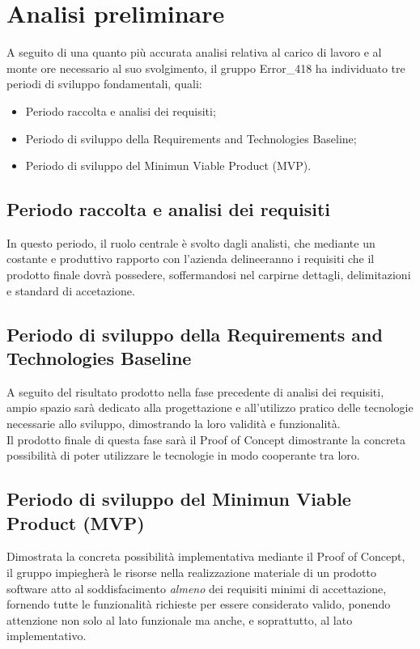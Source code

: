 \documentclass[a4paper, twoside]{article}
\begin{document}
\newpage %



\section{Analisi preliminare}
\large{A seguito di una quanto più accurata analisi relativa al carico di lavoro e al monte ore necessario al suo svolgimento, il gruppo Error\_418 ha individuato tre periodi di sviluppo fondamentali, quali:}
\begin{itemize}
    \item Periodo raccolta e analisi dei requisiti;
    \item Periodo di sviluppo della Requirements and Technologies Baseline;
    \item Periodo di sviluppo del Minimun Viable Product (MVP).
\end{itemize}

\subsection{Periodo raccolta e analisi dei requisiti}
In questo periodo, il ruolo centrale è svolto dagli analisti, che mediante un costante e produttivo rapporto con l'azienda delineeranno i requisiti che il prodotto finale dovrà possedere, soffermandosi nel carpirne dettagli, delimitazioni e standard di accetazione.

\subsection{Periodo di sviluppo della Requirements and Technologies Baseline}
A seguito del risultato prodotto nella fase precedente di analisi dei requisiti, ampio spazio sarà dedicato alla progettazione e all'utilizzo pratico delle tecnologie necessarie allo sviluppo, dimostrando la loro validità e funzionalità. \\
Il prodotto finale di questa fase sarà il Proof of Concept dimostrante la concreta possibilità di poter utilizzare le tecnologie in modo cooperante tra loro.

\subsection{Periodo di sviluppo del Minimun Viable Product (MVP)}
Dimostrata la concreta possibilità implementativa mediante il Proof of Concept, il gruppo impiegherà le risorse nella realizzazione materiale di un prodotto software atto al soddisfacimento \textit{almeno} dei requisiti minimi di accettazione, fornendo tutte le funzionalità richieste per essere considerato valido, ponendo attenzione non solo al lato funzionale ma anche, e soprattutto, al lato implementativo.
\end{document}
